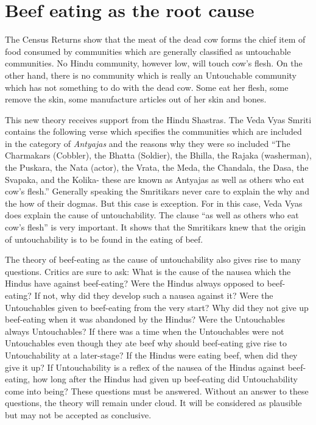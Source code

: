 \documentclass{article}
\begin{document}
\section{Beef eating as the root cause}
\begin{shadequote}
The Census Returns show that the meat of the dead cow forms the chief item of food consumed by communities which are generally classified as untouchable communities. No Hindu community, however low, will touch cow's flesh. On the other hand, there is no community which is really an Untouchable community which has not something to do with the dead cow. Some eat her flesh, some remove the skin, some manufacture articles out of her skin and bones.

This new theory receives support from the Hindu Shastras. The Veda Vyas Smriti contains the following verse which specifies the communities which are included in the category of \emph{Antyajas} and the reasons why they were so included ``The Charmakars (Cobbler), the Bhatta (Soldier), the Bhilla, the Rajaka (washerman), the Puskara, the Nata (actor), the Vrata, the Meda, the Chandala, the Dasa, the Svapaka, and the Kolika- these are known as Antyajas as well as others who eat cow's flesh.''
Generally speaking the Smritikars never care to explain the why and the how of their dogmas. But this case is exception. For in this case, Veda Vyas does explain the cause of untouchability. The clause ``as well as others who eat cow's flesh'' is very important. It shows that the Smritikars knew that the origin of untouchability is to be found in the eating of beef.

The theory of beef-eating as the cause of untouchability also gives rise to many questions. Critics are sure to ask: What is the cause of the nausea which the Hindus have against beef-eating? Were the Hindus always opposed to beef-eating? If not, why did they develop such a nausea against it? Were the Untouchables given to beef-eating from the very start? Why did they not give up beef-eating when it was abandoned by the Hindus? Were the Untouchables always Untouchables? If there was a time when the Untouchables were not Untouchables even though they ate beef why should beef-eating give rise to Untouchability at a later-stage? If the Hindus were eating beef, when did they give it up? If Untouchability is a reflex of the nausea of the Hindus against beef-eating, how long after the Hindus had given up beef-eating did Untouchability come into being? These questions must be answered. Without an answer to these questions, the theory will remain under cloud. It will be considered as plausible but may not be accepted as conclusive.
\end{shadequote}
\end{document}
